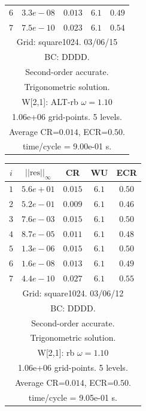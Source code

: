 \begin{table}[hbt]
\begin{center}
{\begin{tabular}{|c|c|c|c|c|}
 $ 6$  & $ 3.3e-08$ & $0.013$ & $ 6.1$ & $0.49$ \\ 
 $ 7$  & $ 7.5e-10$ & $0.023$ & $ 6.1$ & $0.54$ \\ 
\hline 
\multicolumn{5}{|c|}{Grid: square1024. 03/06/15}  \\
\multicolumn{5}{|c|}{BC: DDDD.}  \\
\multicolumn{5}{|c|}{Second-order accurate.}  \\
\multicolumn{5}{|c|}{Trigonometric solution.}  \\
\multicolumn{5}{|c|}{W[2,1]: ALT-rb $\omega=1.10$}  \\
\multicolumn{5}{|c|}{1.06e+06 grid-points. 5 levels.}  \\
\multicolumn{5}{|c|}{Average CR=$0.014$, ECR=$0.50$.}  \\
\multicolumn{5}{|c|}{time/cycle = 9.00e-01 s.}  \\
\hline 
\end{tabular}
\begin{tabular}{|c|c|c|c|c|} \hline 
 $i$   & $\vert\vert\mbox{res}\vert\vert_\infty$  &  CR     &  WU    & ECR  \\   \hline 
 $ 1$  & $ 5.6e+01$ & $0.015$ & $ 6.1$ & $0.50$ \\ 
 $ 2$  & $ 5.2e-01$ & $0.009$ & $ 6.1$ & $0.46$ \\ 
 $ 3$  & $ 7.6e-03$ & $0.015$ & $ 6.1$ & $0.50$ \\ 
 $ 4$  & $ 8.7e-05$ & $0.011$ & $ 6.1$ & $0.48$ \\ 
 $ 5$  & $ 1.3e-06$ & $0.015$ & $ 6.1$ & $0.50$ \\ 
 $ 6$  & $ 1.6e-08$ & $0.013$ & $ 6.1$ & $0.49$ \\ 
 $ 7$  & $ 4.4e-10$ & $0.027$ & $ 6.1$ & $0.55$ \\ 
\hline 
\multicolumn{5}{|c|}{Grid: square1024. 03/06/12}  \\
\multicolumn{5}{|c|}{BC: DDDD.}  \\
\multicolumn{5}{|c|}{Second-order accurate.}  \\
\multicolumn{5}{|c|}{Trigonometric solution.}  \\
\multicolumn{5}{|c|}{W[2,1]: rb $\omega=1.10$}  \\
\multicolumn{5}{|c|}{1.06e+06 grid-points. 5 levels.}  \\
\multicolumn{5}{|c|}{Average CR=$0.014$, ECR=$0.50$.}  \\
\multicolumn{5}{|c|}{time/cycle = 9.05e-01 s.}  \\
\hline 
\end{tabular}
}
\end{center}
\end{table}
